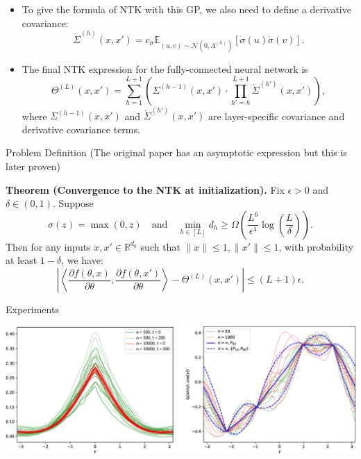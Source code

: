 \documentclass[serif, aspectratio=169]{beamer}
\begin{document}
\begin{frame}

 \begin{itemize}
 	
 \item To give the formula of NTK with this GP, we also need to define a derivative covariance:
 \[
 \dot{\Sigma}^{(h)}(x, x') = c_\sigma \mathbb{E}_{(u, v) \sim \mathcal{N}(0, \Lambda^{(h)})} \left[ \dot{\sigma}(u) \dot{\sigma}(v) \right].
 \]
 
 \item The final NTK expression for the fully-connected neural network is
 \[
 \Theta^{(L)}(x, x') = \sum_{h=1}^{L+1} \left( \Sigma^{(h-1)}(x, x') \cdot \prod_{h'=h}^{L+1} \dot{\Sigma}^{(h')}(x, x') \right),
 \]
 where \( \Sigma^{(h-1)}(x, x') \) and \( \dot{\Sigma}^{(h')}(x, x') \) are layer-specific covariance and derivative covariance terms.
 
 \end{itemize}
\end{frame}
 
 \begin{frame}{Problem Definition}
 	(The original paper has an asymptotic expression but this is later proven)
 	
 \textbf{Theorem (Convergence to the NTK at initialization).} Fix $\epsilon > 0$ and $\delta \in (0,1)$. Suppose 
 \[
 \sigma(z) = \max(0, z) \quad \text{and} \quad \min_{h \in [L]} d_h \geq \Omega\left(\frac{L^6}{\epsilon^4} \log\left(\frac{L}{\delta}\right)\right).
 \]
 Then for any inputs $x, x' \in \mathbb{R}^{d_0}$ such that $\|x\| \leq 1, \|x'\| \leq 1$, with probability at least $1 - \delta$, we have:
 \[
 \left| \left\langle \frac{\partial f(\theta, x)}{\partial \theta}, \frac{\partial f(\theta, x')}{\partial \theta} \right\rangle - \Theta^{(L)}(x, x') \right| \leq (L + 1)\epsilon.
 \]
 \end{frame}
 
 \begin{frame}{Experiments}
 	
  \centering %
 \includegraphics[width=\textwidth]{pic/NTK_paper_exp.png} %
  \end{frame}
 
\end{document}
